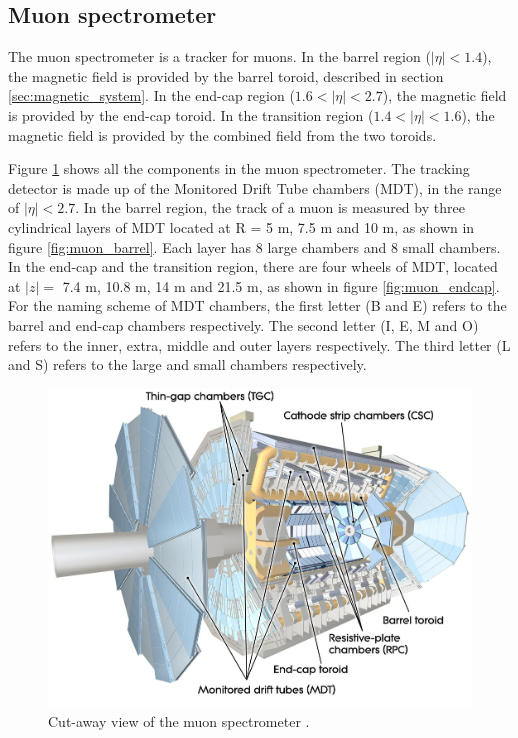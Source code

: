 \subsection{Muon spectrometer}
The muon spectrometer is a tracker for muons.
In the barrel region ($|\eta| < 1.4$), the magnetic field is provided by the barrel toroid, described in section \ref{sec:magnetic_system}.
In the end-cap region ($1.6 < |\eta| < 2.7$), the magnetic field is provided by the end-cap toroid.
In the transition region ($1.4 < |\eta| < 1.6$), the magnetic field is provided by the combined field from the two toroids.

Figure \ref{fig:muon_spectrometer} shows all the components in the muon spectrometer.
The tracking detector is made up of the Monitored Drift Tube chambers (MDT), in the range of $|\eta| < 2.7$.
In the barrel region, the track of a muon is measured by three cylindrical layers of MDT located at R = 5 m, 7.5 m and 10 m, as shown in figure \ref{fig:muon_barrel}.
Each layer has 8 large chambers and 8 small chambers.
In the end-cap and the transition region, there are four wheels of MDT, located at $|z|=$ 7.4 m, 10.8 m, 14 m and 21.5 m, as shown in figure \ref{fig:muon_endcap}.
For the naming scheme of MDT chambers, the first letter (B and E) refers to the barrel and end-cap chambers respectively.
The second letter (I, E, M and O) refers to the inner, extra, middle and outer layers respectively.
The third letter (L and S) refers to the large and small chambers respectively.

\begin{figure}
\centering
\includegraphics[width=\textwidth]{data/photo/detector/muon_spectrometer.jpg}
\caption{Cut-away view of the muon spectrometer \cite{muon_spectrometer}.}
\label{fig:muon_spectrometer}
\end{figure}

